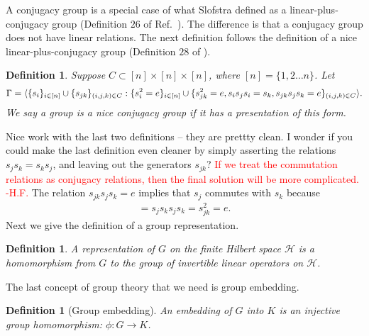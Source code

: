 \documentclass[11pt,letterpaper]{article}
\DeclarePairedDelimiter{\ip}{\langle}{\rangle}
\newcommand{\calH}{\mathcal{H}}
\newcommand{\1}{\mathbb{1}}
\def\carl#1{{\color{blue} #1}}
\newcommand{\hfc}[1]{\textcolor{red}{#1 -H.F.}}
\newtheorem{definition}[theorem]{Definition}
\theoremstyle{definition}
\begin{document}
A conjugacy group is a special case of what Slofstra defined as 
a linear-plus-conjugacy group (Definition $26$ of Ref.~\cite{slofstra2017}). The difference is that a conjugacy group does not have linear relations. The next definition follows the 
definition of a nice linear-plus-conjugacy group (Definition $28$ of \cite{slofstra2017}).
\begin{definition}
    \label{def:nice_conj_grp}
    Suppose $C \subset [n] \times [n] \times [n]$, where $[n] = \{1,2 \dots n\}$. 
    Let 
    \begin{align*}
        \Gamma = \ip{\{s_i\}_{i \in [n]} \cup \{s_{jk}\}_{(i,j,k)\in C} :
        \{s_i^2=e\}_{i\in [n]} \cup 
        \{s_{jk}^2 = e, s_is_js_i = s_k, s_{jk}s_js_k = e\}_{(i,j,k)\in C}}.
    \end{align*}
    We say a group is a nice conjugacy group if it has a presentation of this form. 
\end{definition}
\carl{Nice work with the last two definitions -- they are prettty clean.  I wonder if you could make the last definition even cleaner by simply asserting the relations $s_j s_k = s_k s_j$, and leaving out the generators $s_{jk}$?}
\hfc{If we treat the commutation relations as conjugacy relations, then the final solution will be more complicated.}
The relation $s_{jk} s_js_k = e$ implies that $s_j$ commutes with $s_k$
because
\begin{align*}
    [s_j, s_k] = s_js_ks_js_k = s_{jk}^2 = e.
\end{align*}
Next we give the definition of a group representation. 
\begin{definition}
    A representation of $G$ on the finite Hilbert space $\calH$ is a homomorphism from $G$ to the group of invertible linear operators on $\calH$. 
\end{definition}
The last concept of group theory that we need is group embedding.
\begin{definition}[Group embedding]
    An embedding of $G$ into $K$ is an injective group homomorphism: $\phi: G \rightarrow K$.
\end{definition}
\end{document}
